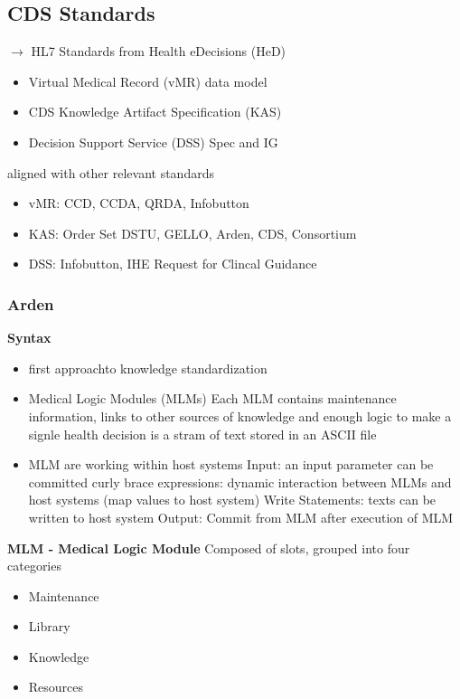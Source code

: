 \documentclass{report}
\theoremstyle{definition}
\theoremstyle{example}
\begin{document}
\subsection{CDS Standards}
$\rightarrow$ HL7 Standards from Health eDecisions (HeD)
\begin{itemize}
   \item Virtual Medical Record (vMR) data model
   \item CDS Knowledge Artifact Specification (KAS)
   \item Decision Support Service (DSS) Spec and IG
\end{itemize}

aligned with other relevant standards
\begin{itemize}
   \item vMR: CCD, CCDA, QRDA, Infobutton
   \item KAS: Order Set DSTU, GELLO, Arden, CDS, Consortium
   \item DSS: Infobutton, IHE Request for Clincal Guidance
\end{itemize}

\subsubsection{Arden}
\textbf{Syntax}
\begin{itemize}
   \item first approachto knowledge standardization
   \item Medical Logic Modules (MLMs)
   \subitem Each MLM contains maintenance information, links to other sources of knowledge and enough logic to make a signle health decision
   \subitem is a stram of text stored in an ASCII file
   \item MLM are working within host systems
   \subitem Input: an input parameter can be committed
   \subitem curly brace expressions: dynamic interaction between MLMs and host systems (map values to host system)
   \subitem Write Statements: texts can be written to host system
   \subitem Output: Commit from MLM after execution of MLM 
\end{itemize}

\textbf{MLM - Medical Logic Module}
Composed of slots, grouped into four categories
\begin{itemize}
   \item Maintenance
   \item Library
   \item Knowledge
   \item Resources
\end{itemize}
\end{document}
